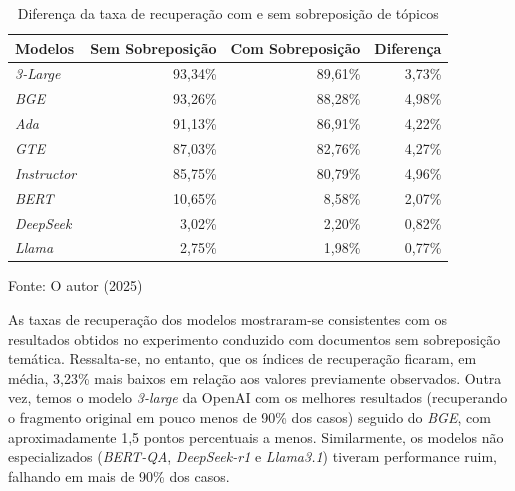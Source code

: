 \begin{table}[H]
    \caption{Diferença da taxa de recuperação com e sem sobreposição de tópicos}
    \centering
    \begin{tabular}{ l r r r }
        \hline
        \textbf{Modelos} & \textbf{Sem Sobreposição} & \textbf{Com Sobreposição} & \textbf{Diferença} \\
        \hline
        \textit{3-Large} & 93,34\% & 89,61\% & 3,73\% \\
        \textit{BGE} & 93,26\% & 88,28\% & 4,98\% \\
        \textit{Ada} & 91,13\% & 86,91\% & 4,22\% \\
        \textit{GTE} & 87,03\% & 82,76\% & 4,27\% \\
        \textit{Instructor} & 85,75\% & 80,79\% & 4,96\% \\
        \textit{BERT} & 10,65\% & 8,58\% & 2,07\% \\
        \textit{DeepSeek} & 3,02\% & 2,20\% & 0,82\% \\
        \textit{Llama} & 2,75\% & 1,98\% & 0,77\% \\
        \hline
    \end{tabular}
    
    Fonte: O autor (2025)
    \label{tab:recuperacao-comparacao-sobreposicao-topicos}
\end{table}

As taxas de recuperação dos modelos mostraram-se consistentes com os resultados obtidos no experimento conduzido com documentos sem sobreposição temática. Ressalta-se, no entanto, que os índices de recuperação ficaram, em média, 3,23\% mais baixos em relação aos valores previamente observados. Outra vez, temos o modelo \textit{3-large} da OpenAI com os melhores resultados (recuperando o fragmento original em pouco menos de 90\% dos casos) seguido do \textit{BGE}, com aproximadamente 1,5 pontos percentuais a menos. Similarmente, os modelos não especializados (\textit{BERT-QA}, \textit{DeepSeek-r1} e \textit{Llama3.1}) tiveram performance ruim, falhando em mais de 90\% dos casos.

